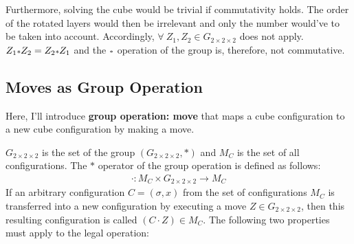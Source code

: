 \documentclass[12pt,a4paper]{article}
\theoremstyle{custom}
\newcommand{\Gtwo}{\ensuremath{G_{2\times 2\times 2}}}
\begin{document}
Furthermore, solving the cube would be trivial if commutativity holds. \cite{TD} The order of the rotated layers would then be irrelevant and only the number would've to be taken into account.
Accordingly, $\forall \ Z_1, Z_2 \in \Gtwo$ does not apply. $Z_1 \mathlarger{\scriptstyle*} Z_2 = Z_2 \mathlarger{\scriptstyle*} Z_1$ and the $\mathlarger{\scriptstyle*}$ operation of the group is, therefore, not commutative.

\subsection{Moves as Group Operation}
Here, I'll introduce \textbf{group operation: move} that maps a cube configuration to a new cube configuration by making a move. %

$\Gtwo$ is the set of the group $\left(\Gtwo, \scriptstyle*\right)$ and $M_C$ is the set of all configurations. The $\scriptstyle*$ operator of the group operation is defined as follows:
\begin{align*}
\cdot: M_C \times \Gtwo \rightarrow M_C
\end{align*}
If an arbitrary configuration $C=(\sigma, x)$ from the set of configurations $M_C$ is transferred into a new configuration by executing a move $Z \in \Gtwo$, then this resulting configuration is called $(C \cdot Z)  \in M_C$.
The following two properties must apply to the legal operation:
\end{document}
